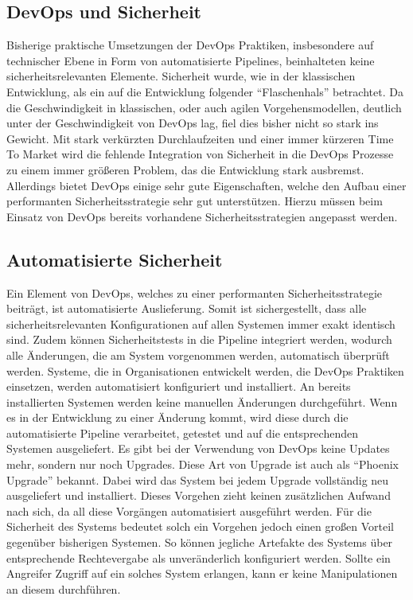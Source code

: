 \subsection{DevOps und Sicherheit}
Bisherige praktische Umsetzungen der DevOps Praktiken, insbesondere auf technischer Ebene in Form von automatisierte Pipelines, beinhalteten keine sicherheitsrelevanten Elemente. 
Sicherheit wurde, wie in der klassischen Entwicklung, als ein auf die Entwicklung folgender \enquote{Flaschenhals} betrachtet. 
Da die Geschwindigkeit in klassischen, oder auch agilen Vorgehensmodellen, deutlich unter der Geschwindigkeit von DevOps lag, fiel dies bisher nicht so stark ins Gewicht. 
Mit stark verkürzten Durchlaufzeiten und einer immer kürzeren Time To Market wird die fehlende Integration von Sicherheit in die DevOps Prozesse zu einem immer größeren Problem, das die Entwicklung stark ausbremst. 
Allerdings bietet DevOps einige sehr gute Eigenschaften, welche den Aufbau einer performanten Sicherheitsstrategie sehr gut unterstützen. 
Hierzu müssen beim Einsatz von DevOps bereits vorhandene Sicherheitsstrategien angepasst werden.

\subsection{Automatisierte Sicherheit}
Ein Element von DevOps, welches zu einer performanten Sicherheitsstrategie beiträgt, ist automatisierte Auslieferung. 
Somit ist sichergestellt, dass alle sicherheitsrelevanten Konfigurationen auf allen Systemen immer exakt identisch sind. 
Zudem können Sicherheitstests in die Pipeline integriert werden, wodurch alle Änderungen, die am System vorgenommen werden, automatisch überprüft werden.
Systeme, die in Organisationen entwickelt werden, die DevOps Praktiken einsetzen, werden automatisiert konfiguriert und installiert. 
An bereits installierten Systemen werden keine manuellen Änderungen durchgeführt. 
Wenn es in der Entwicklung zu einer Änderung kommt, wird diese durch die automatisierte Pipeline verarbeitet, getestet und auf die entsprechenden Systemen ausgeliefert. 
Es gibt bei der Verwendung von DevOps keine Updates mehr, sondern nur noch Upgrades.
Diese Art von Upgrade ist auch als \enquote{Phoenix Upgrade} bekannt. 
Dabei wird das System bei jedem Upgrade vollständig neu ausgeliefert und installiert. 
Dieses Vorgehen zieht keinen zusätzlichen Aufwand nach sich, da all diese Vorgängen automatisiert ausgeführt werden.
Für die Sicherheit des Systems bedeutet solch ein Vorgehen jedoch einen großen Vorteil gegenüber bisherigen Systemen. 
So können jegliche Artefakte des Systems über entsprechende Rechtevergabe als unveränderlich konfiguriert werden. 
Sollte ein Angreifer Zugriff auf ein solches System erlangen, kann er keine Manipulationen an diesem durchführen.

